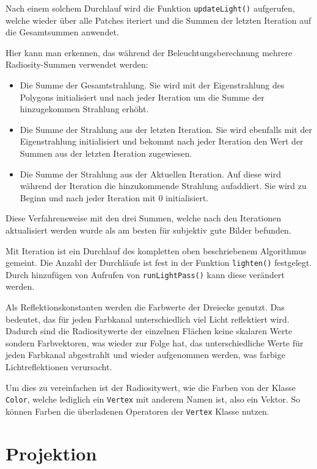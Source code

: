 \documentclass[final,a4paper,11pt,notitlepage,halfparskip]{scrreprt}
\begin{document}
Nach einem solchem Durchlauf wird die Funktion \texttt{updateLight()}
aufgerufen, welche wieder über alle Patches iteriert und die Summen der letzten
Iteration auf die Gesamtsummen anwendet.

Hier kann man erkennen, das während der Beleuchtungsberechnung mehrere
Radiosity-Summen verwendet werden:
\begin{itemize}
  \item Die Summe der Gesamtstrahlung. Sie wird mit der Eigenstrahlung des
    Polygons initialisiert und nach jeder Iteration um die Summe der
    hinzugekommen Strahlung erhöht.
  \item Die Summe der Strahlung aus der letzten Iteration. Sie wird ebenfalls
    mit der Eigenstrahlung initialisiert und bekommt nach jeder Iteration den
    Wert der Summen aus der letzten Iteration zugewiesen.
  \item Die Summe der Strahlung aus der Aktuellen Iteration. Auf diese wird
    während der Iteration die hinzukommende Strahlung aufaddiert. Sie wird zu
    Beginn und nach jeder Iteration mit $0$ initialisiert.
\end{itemize}
Diese Verfahrensweise mit den drei Summen, welche nach den Iterationen
aktualisiert werden wurde als am besten für subjektiv gute Bilder befunden.

Mit Iteration ist ein Durchlauf des kompletten oben beschriebenem Algorithmus
gemeint. Die Anzahl der Durchläufe ist fest in der Funktion \texttt{lighten()} 
festgelegt. Durch hinzufügen von Aufrufen von \texttt{runLightPass()} kann diese
verändert werden.

Als Reflektionskonstanten werden die Farbwerte der Dreiecke genutzt. Das
bedeutet, das für jeden Farbkanal unterschiedlich viel Licht reflektiert wird.
Dadurch sind die Radiositywerte der einzelnen Flächen keine skalaren Werte
sondern Farbvektoren, was wieder zur Folge hat, das unterschiedliche Werte für
jeden Farbkanal abgestrahlt und wieder aufgenommen werden, was farbige
Lichtreflektionen verursacht.

Um dies zu vereinfachen ist der Radiositywert, wie die Farben von der Klasse
\texttt{Color}, welche lediglich ein \texttt{Vertex} mit anderem Namen ist, also
ein Vektor. So können Farben die überladenen Operatoren der \texttt{Vertex}
Klasse nutzen.

\section{Projektion}\label{sec:proj}
\end{document}
